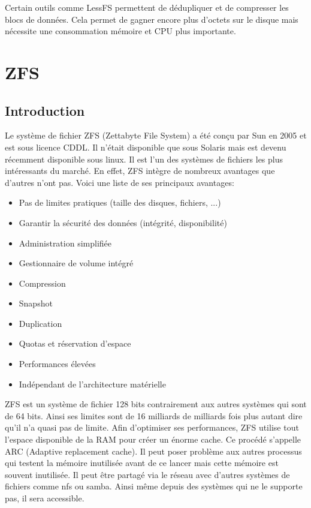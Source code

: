 \documentclass[a4paper]{report}
\begin{document}
Certain outils comme LessFS permettent de dédupliquer et de compresser les blocs de données. Cela permet de gagner encore plus d'octets sur le disque mais nécessite une consommation mémoire et CPU plus importante.

	\chapter{ZFS}
	\section{Introduction}
	Le système de fichier ZFS (Zettabyte File System) a été conçu par Sun en 2005 et est sous licence CDDL.  Il n'était disponible que sous Solaris mais est devenu récemment disponible sous linux. Il est l'un des systèmes de fichiers les plus intéressants du marché. En effet, ZFS intègre de nombreux avantages que d'autres n'ont pas. Voici une liste de ses principaux avantages: \\
	\begin{itemize}
		 \item Pas de limites pratiques (taille des disques, fichiers, ...)
		 \item Garantir la sécurité des données (intégrité, disponibilité)
		 \item Administration simplifiée
		 \item Gestionnaire de volume intégré
		 \item Compression
		 \item Snapshot
		 \item Duplication
		 \item Quotas et réservation d’espace
		 \item Performances élevées
		 \item Indépendant de l’architecture matérielle\\
	\end{itemize}
	ZFS est un système de fichier 128 bits contrairement aux autres systèmes qui sont de 64 bits. Ainsi ses limites sont de 16 milliards de milliards fois plus autant dire qu'il n'a quasi pas de limite. Afin d'optimiser ses performances, ZFS utilise tout l'espace disponible de la RAM pour créer un énorme cache. Ce procédé s'appelle ARC (Adaptive replacement cache). Il peut poser problème aux autres processus qui testent la mémoire inutilisée avant de ce lancer mais cette mémoire est souvent inutilisée. Il peut être partagé via le réseau avec d'autres systèmes de fichiers comme nfs ou samba. Ainsi même depuis des systèmes qui ne le supporte pas, il sera accessible.\\
\end{document}
